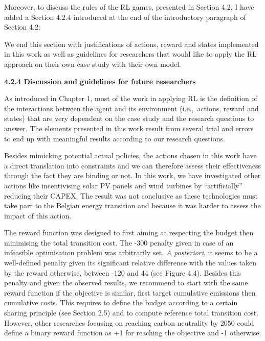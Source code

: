 \documentclass[12pt,a4paper]{article}
\def\ie{i.e.,\ }
\begin{document}
Moreover, to discuss the rules of the RL games, presented in Section 4.2, I have added {\color{blue}a Section 4.2.4} introduced {\color{blue}at the end of the introductory paragraph of Section 4.2}:

\begin{mdframed}[style=manuscript] %
We end this section with justifications of actions, reward and states implemented in this work as well as guidelines for researchers that would like to apply the RL approach on their own case study with their own model.
\end{mdframed}

\begin{mdframed}[style=manuscript] %
\textbf{4.2.4 Discussion and guidelines for future researchers}

As introduced in Chapter 1, most of the work in applying RL is the definition of the interactions between the agent and its environment (\ie actions, reward and states) that are very dependent on the case study and the research questions to answer. The elements presented in this work result from several trial and errors to end up with meaningful results according to our research questions.

Besides mimicking potential actual policies, the actions chosen in this work have a direct translation into constraints and we can therefore assess their effectiveness through the fact they are binding or not. In this work, we have investigated other actions like incentivising solar PV panels and wind turbines by ``artificially'' reducing their CAPEX. The result was not conclusive as these technologies must take part to the Belgian energy transition and because it was harder to assess the impact of this action. 

The reward function was designed to first aiming at respecting the  budget then minimising the total transition cost. The -300 penalty given in case of an infeasible optimisation problem was arbitrarily set. \textit{A posteriori}, it seems to be a well-defined penalty given its significant relative difference with the values taken by the reward otherwise, between -120 and 44 (see Figure 4.4). Besides this penalty and given the observed results, we recommend to start with the same reward function if the objective is similar, first target cumulative emissions then cumulative costs. This requires to define the  budget according to a certain sharing principle (see Section 2.5) and to compute reference total transition cost. However, other researches focusing on reaching carbon neutrality by 2050 could define a binary reward function as +1 for reaching the objective and -1 otherwise.


\end{mdframed}
\end{document}
